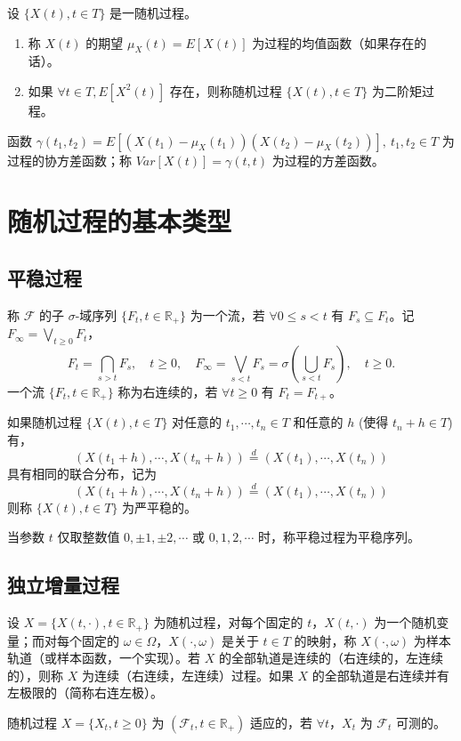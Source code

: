 \documentclass[lang=cn,10pt,thmcnt=section]{elegantbook}
\begin{document}
\begin{definition}
	设 $\{X(t), t \in T\}$ 是一随机过程。
\begin{enumerate}
    \item 称 $X(t)$ 的期望 $\mu_X(t) = E[X(t)]$ 为过程的均值函数（如果存在的话）。
    \item 如果 $\forall t \in T, E[X^2(t)]$ 存在，则称随机过程 $\{X(t), t \in T\}$ 为二阶矩过程。
\end{enumerate}
\end{definition}
函数 $\gamma(t_1, t_2) = E[(X(t_1) - \mu_X(t_1))(X(t_2) - \mu_X(t_2))], \ t_1, t_2 \in T$ 为过程的协方差函数；称 $Var[X(t)] = \gamma(t, t)$ 为过程的方差函数。

\section{随机过程的基本类型}
\subsection{平稳过程}
\begin{definition}
	称 $\mathcal{F}$ 的子 $\sigma$-域序列 $\{F_t, t \in \mathbb{R}_+\}$ 为一个流，若 $\forall 0 \leq s < t$ 有 $F_s \subseteq F_t$。记 $F_\infty = \bigvee_{t \geq 0} F_t$，
\[
F_t = \bigcap_{s > t} F_s, \quad t \geq 0, \quad F_\infty = \bigvee_{s < t} F_s = \sigma\left(\bigcup_{s < t} F_s\right), \quad t \geq 0.
\]
一个流 $\{F_t, t \in \mathbb{R}_+\}$ 称为右连续的，若 $\forall t \geq 0$ 有 $F_t = F_{t+}$。
\end{definition}
\begin{definition}
	如果随机过程 $\{X(t), t \in T\}$ 对任意的 $t_1, \cdots, t_n \in T$ 和任意的 $h$ (使得 $t_n + h \in T$) 有，
	\[
	(X(t_1 + h), \cdots, X(t_n + h)) \overset{d}{=} (X(t_1), \cdots, X(t_n))
	\]
	具有相同的联合分布，记为
	\[
	(X(t_1 + h), \cdots, X(t_n + h)) \overset{d}{=} (X(t_1), \cdots, X(t_n))
	\]
	则称 $\{X(t), t \in T\}$ 为严平稳的。
	
	当参数 $t$ 仅取整数值 $0, \pm 1, \pm 2, \cdots$ 或 $0, 1, 2, \cdots$ 时，称平稳过程为平稳序列。
\end{definition}
\subsection{独立增量过程}
\begin{definition}
	设 $X = \{X(t, \cdot), t \in \mathbb{R}_+\}$ 为随机过程，对每个固定的 $t$，$X(t, \cdot)$ 为一个随机变量；而对每个固定的 $\omega \in \Omega$，$X(\cdot, \omega)$ 是关于 $t \in T$ 的映射，称 $X(\cdot, \omega)$ 为样本轨道（或样本函数，一个实现）。若 $X$ 的全部轨道是连续的（右连续的，左连续的），则称 $X$ 为连续（右连续，左连续）过程。如果 $X$ 的全部轨道是右连续并有左极限的（简称右连左极）。
\end{definition}
\begin{definition}
	随机过程 $X = \{X_t, t \geq 0\}$ 为 $(\mathcal{F}_t, t \in \mathbb{R}_+)$ 适应的，若 $\forall t$，$X_t$ 为 $\mathcal{F}_t$ 可测的。
\end{definition}
\end{document}
